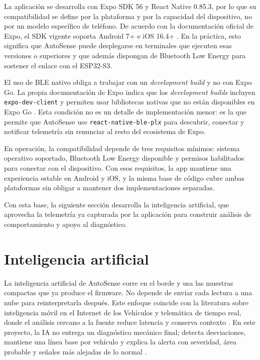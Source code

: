 \documentclass[12pt,letterpaper]{report}
\begin{document}
La aplicación se desarrolla con Expo SDK 56 y React Native 0.85.3, por lo que su compatibilidad se define por la plataforma y por la capacidad del dispositivo, no por un modelo específico de teléfono. De acuerdo con la documentación oficial de Expo, el SDK vigente soporta Android 7+ e iOS 16.4+ \cite{expo2026_sdk_support}. En la práctica, esto significa que AutoSense puede desplegarse en terminales que ejecuten esas versiones o superiores y que además dispongan de Bluetooth Low Energy para sostener el enlace con el ESP32-S3.

El uso de BLE nativo obliga a trabajar con un \textit{development build} y no con Expo Go. La propia documentación de Expo indica que los \textit{development builds} incluyen \texttt{expo-dev-client} y permiten usar bibliotecas nativas que no están disponibles en Expo Go \cite{expo2026_development_build}. Esta condición no es un detalle de implementación menor: es la que permite que AutoSense use \texttt{react-native-ble-plx} para descubrir, conectar y notificar telemetría sin renunciar al resto del ecosistema de Expo.

En operación, la compatibilidad depende de tres requisitos mínimos: sistema operativo soportado, Bluetooth Low Energy disponible y permisos habilitados para conectar con el dispositivo. Con esos requisitos, la app mantiene una experiencia estable en Android y iOS, y la misma base de código cubre ambas plataformas sin obligar a mantener dos implementaciones separadas.

Con esta base, la siguiente sección desarrolla la inteligencia artificial, que aprovecha la telemetría ya capturada por la aplicación para construir análisis de comportamiento y apoyo al diagnóstico.

\section{Inteligencia artificial}

\label{sec:inteligencia-artificial}

La inteligencia artificial de AutoSense corre en el borde y usa las muestras compactas que ya produce el firmware. No depende de enviar cada lectura a una nube para reinterpretarla después. Este enfoque coincide con la literatura sobre inteligencia móvil en el Internet de los Vehículos y telemática de tiempo real, donde el análisis cercano a la fuente reduce latencia y conserva contexto \cite{zhang2020_iov_edge,selvaraj2023_advanced_telematics,kalalas2025_ai_driven_monitoring}. En este proyecto, la IA no entrega un diagnóstico mecánico final; detecta desviaciones, mantiene una línea base por vehículo y explica la alerta con severidad, área probable y señales más alejadas de lo normal \cite{michailidis2025_obdii_review,tormos2025_explainable_ai,mahale2025_review_predictive_maintenance}.
\end{document}

